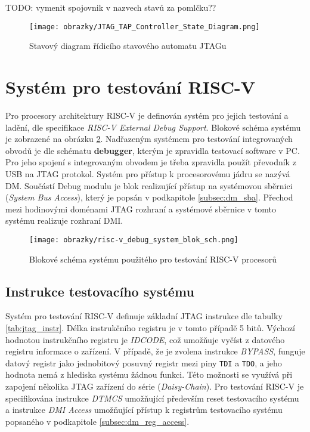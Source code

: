 TODO: vymenit spojovnik v nazvech stavů za pomlčku??

\begin{figure}[H]
  \begin{center}
    \texttt{[image: obrazky/JTAG\_TAP\_Controller\_State\_Diagram.png]}
  \end{center}
  \caption{Stavový diagram řídicího stavového automatu JTAGu \cite{JTAG_TAP_diagram}}
	\label{fig:tap_controller}
\end{figure}

\section{Systém pro testování \acs{RISC-V}}		\label{sec:risc-v_dbg}
Pro procesory architektury \acs{RISC-V} je definován systém pro jejich testování a ladění, dle specifikace \textit{RISC-V External Debug Support}. Blokové schéma systému je zobrazené na obrázku \ref{fig:blok_sch_risc-v_dbg}. Nadřazeným systémem pro testování integrovaných obvodů je dle schématu \textbf{debugger}, kterým je zpravidla testovací software v PC. Pro jeho spojení s integrovaným obvodem je třeba zpravidla použít převodník z USB na JTAG protokol. Systém pro přístup k procesorovému jádru se nazývá \ac{DM}. Součástí Debug modulu je blok realizující přístup na systémovou sběrnici (\textit{System Bus Access}), který je popsán v podkapitole \ref{subsec:dm_sba}. Přechod mezi hodinovými doménami \acs{JTAG} rozhraní a systémové sběrnice v tomto systému realizuje rozhraní \ac{DMI}. \cite{risc-v_dbg}


\begin{figure}[!h]
  \begin{center}
    \texttt{[image: obrazky/risc-v\_debug\_system\_blok\_sch.png]}
  \end{center}
  \caption{Blokové schéma systému použitého pro testování \acs{RISC-V} procesorů \cite{risc-v_dbg}}
	\label{fig:blok_sch_risc-v_dbg}
\end{figure}

\subsection{Instrukce testovacího systému}	\label{subsec:jtag_instr}
Systém pro testování \acs{RISC-V} definuje základní \acs{JTAG} instrukce dle tabulky \ref{tab:jtag_instr}. Délka instrukčního registru je v tomto případě 5 bitů. Výchozí hodnotou instrukčního registru je \textit{IDCODE}, což umožňuje vyčíst z datového registru informace o zařízení. V případě, že je zvolena instrukce \textit{BYPASS}, funguje datový registr jako jednobitový posuvný registr mezi piny \texttt{TDI} a \texttt{TDO}, a jeho hodnota nemá z hlediska systému žádnou funkci. Této možnosti se využívá při zapojení několika \acs{JTAG} zařízení do série (\textit{Daisy-Chain}). Pro testování \acs{RISC-V} je specifikována instrukce \textit{DTMCS} umožňující především reset testovacího systému a instrukce \textit{DMI Access} umožňující přístup k registrům testovacího systému popsaného v podkapitole \ref{subsec:dm_reg_access}. \cite {IEEE_1149-1} \cite{risc-v_dbg}

